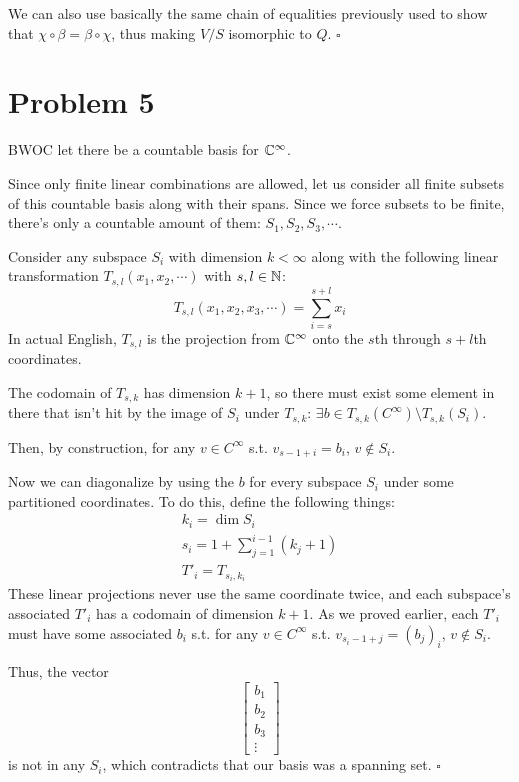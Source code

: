 \documentclass[12pt]{article}
\begin{document}
We can also use basically the same chain of equalities previously
used to show that $\chi \circ \beta=\beta \circ \chi$, thus making
$V/S$ isomorphic to $Q$. $\square$

\pagebreak

\section{Problem 5}

BWOC let there be a countable basis for $\mathbb{C}^\infty$.

Since only finite linear combinations are allowed, let us consider
all finite subsets of this countable basis along with their spans.
Since we force subsets to be finite, there's only a countable amount of them:
$S_1, S_2, S_3, \cdots$.

Consider any subspace $S_i$ with dimension $k < \infty$
along with the following linear transformation $T_{s,l}(x_1, x_2, \cdots)$ with $s,l \in \mathbb{N}$:
\[T_{s,l}(x_1, x_2, x_3, \cdots) = \sum_{i=s}^{s+l} x_i\]
In actual English, $T_{s,l}$ is the projection from $\mathbb{C}^\infty$ onto the $s$th through $s+l$th coordinates.

The codomain of $T_{s,k}$ has dimension $k+1$, so there must exist some element
in there that isn't hit by the image of $S_i$ under $T_{s,k}$:
$\exists b \in T_{s,k}\left(C^\infty\right) \setminus T_{s,k}(S_i)$.

Then, by construction, for any $v \in C^\infty$ s.t. $v_{s-1+i}=b_i$, $v \notin S_i$.

Now we can diagonalize by using the $b$ for every subspace $S_i$ under some partitioned coordinates.
To do this, define the following things:
\begin{gather*}
  k_i=\dim S_i \\
  s_i=1+\sum_{j=1}^{i-1} (k_j+1) \\
  T'_i=T_{s_i,k_i}
\end{gather*}
These linear projections never use the same coordinate twice, and each subspace's
associated $T'_i$ has a codomain of dimension $k+1$.
As we proved earlier, each $T'_i$ must have some associated $b_i$ s.t.
for any $v \in C^\infty$ s.t. $v_{s_i-1+j}=(b_j)_i$, $v \notin S_i$.

Thus, the vector
\[\begin{bmatrix}
  b_1 \\
  b_2 \\
  b_3 \\
  \vdots
\end{bmatrix}\]
is not in any $S_i$, which contradicts that our basis was a spanning set. $\square$
\end{document}
